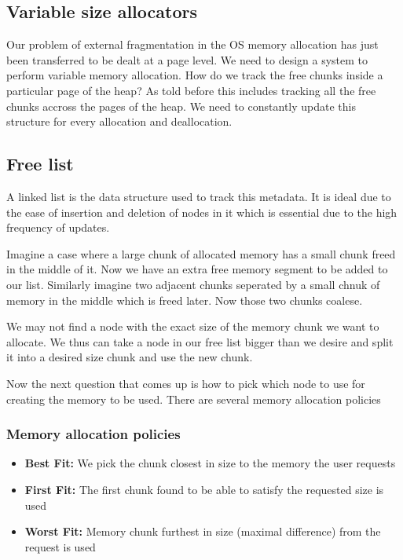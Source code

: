 \documentclass[12pt]{article}
\begin{document}
\subsection*{Variable size allocators}
Our problem of external fragmentation in the OS memory allocation 
has just been transferred to be dealt at a page level.
We need to design a system to perform variable memory allocation. How do we track the free chunks inside a particular page of the heap? As told before this includes tracking all the free chunks accross the pages of the heap.
We need to constantly update this structure for every allocation and deallocation. 
\subsection{Free list}
A linked list is the data structure used to track this metadata. It is ideal due to the ease of insertion and deletion of nodes in it which is essential due to the high frequency of updates. 

Imagine a case where a large chunk of allocated memory has a small chunk freed in the middle of it. Now we have an extra free memory segment to be added to our list.
Similarly imagine two adjacent chunks seperated by a small chnuk of memory in the middle which is freed later. Now those two chunks coalese. 



We may not find a node with the exact size of the memory chunk we want to allocate. We thus can take a node in our free list bigger than we desire and split it into a desired size chunk and use the new chunk.

Now the next question that comes up is how to pick which node to use for creating the memory to be used.
There are several memory allocation policies

\subsubsection*{Memory allocation policies}
\begin{itemize}[topsep=0pt, partopsep=0pt, itemsep=0pt, parsep=0pt]
        \item \textbf{Best Fit:} We pick the chunk closest in size to the memory the user requests
        \item \textbf{First Fit:} The first chunk found to be able to satisfy the requested size is used
        \item \textbf{Worst Fit:} Memory chunk furthest in size (maximal difference) from the request is used
\end{itemize}
\end{document}
